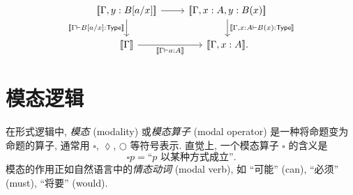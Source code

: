 \begin{example}
\begin{itemize}
		\[\begin{tikzcd}[ampersand replacement=\&]
			{\interpretation{\Gamma,y: B[a/x]}} \& {\interpretation{\Gamma,x:A,y:B(x)}} \\
			{\interpretation{\Gamma}} \& {\interpretation{\Gamma,x:A}.}
			\arrow[from=1-1, to=1-2]
			\arrow["{\interpretation{\Gamma\vdash B[a/x]:\mathsf {Type}}}"', from=1-1, to=2-1]
			\arrow["{\interpretation{\Gamma,x:A \vdash B(x):\mathsf {Type}}}", from=1-2, to=2-2]
			\arrow["{\interpretation{\Gamma\vdash a:A}}"', from=2-1, to=2-2]
		\end{tikzcd}\]
	\end{itemize}
\end{example}

%	

\section{模态逻辑}

\label{appendix-modal-logic}

在形式逻辑中, \emph{模态} (modality) 或\emph{模态算子} (modal operator) 是一种将命题变为命题的算子, 通常用 $\square$, $\lozenge$, $\bigcirc$ 等符号表示. 直觉上, 一个模态算子 $\square$ 的含义是
$$\square p = \text{``$p$ 以某种方式成立''}.$$
模态的作用正如自然语言中的\emph{情态动词} (modal verb), 如 ``可能'' (can), ``必须'' (must), ``将要'' (would).

